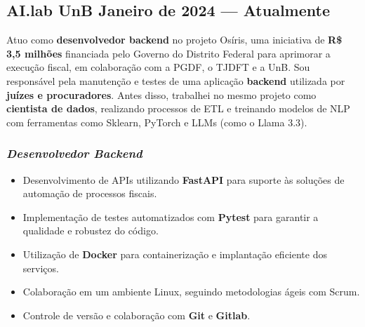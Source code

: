 \documentclass[a4paper,12pt]{article}
\begin{document}




\subsection*{\large AI.lab UnB \hfill Janeiro de 2024 --- Atualmente}


\vspace{0.5em}

Atuo como \textbf{desenvolvedor backend} no projeto Osíris, uma iniciativa de \textbf{R\$ 3,5 milhões} financiada pelo Governo do Distrito Federal
para aprimorar a execução fiscal, em colaboração com a PGDF, o TJDFT e a UnB.
Sou responsável pela manutenção e testes de uma aplicação \textbf{backend} utilizada por \textbf{juízes e procuradores}.
Antes disso, trabalhei no mesmo projeto como \textbf{cientista de dados}, realizando processos de ETL e treinando modelos de NLP com ferramentas como Sklearn, PyTorch e LLMs (como o Llama 3.3).

\vspace{1em}

\subsubsection*{\small \textit{Desenvolvedor Backend} }
\vspace{-1em}
\vspace{-0.5em}
\begin{itemize}
    \item Desenvolvimento de APIs utilizando \textbf{FastAPI} para suporte às soluções de automação de processos fiscais.
    \item Implementação de testes automatizados com \textbf{Pytest} para garantir a qualidade e robustez do código.
    \item Utilização de \textbf{Docker} para containerização e implantação eficiente dos serviços.
    \item Colaboração em um ambiente Linux, seguindo metodologias ágeis com Scrum.
    \item Controle de versão e colaboração com \textbf{Git} e \textbf{Gitlab}.
\end{itemize}
\end{document}
